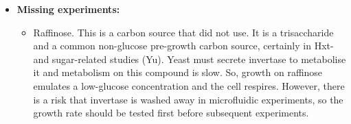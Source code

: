 \begin{itemize}
\item \textbf{Missing experiments:}
\begin{itemize}
\item Raffinose.  This is a carbon source that \textcite{papagiannakisAutonomousMetabolicOscillations2017} did not use.  It is a trisaccharide and a common non-glucose pre-growth carbon source, certainly in Hxt- and sugar-related studies (Yu).  Yeast must secrete invertase to metabolise it and metabolism on this compound is slow.  So, growth on raffinose emulates a low-glucose concentration and the cell respires.  However, there is a risk that invertase is washed away in microfluidic experiments, so the growth rate should be tested first before subsequent experiments.
\end{itemize}
\end{itemize}

